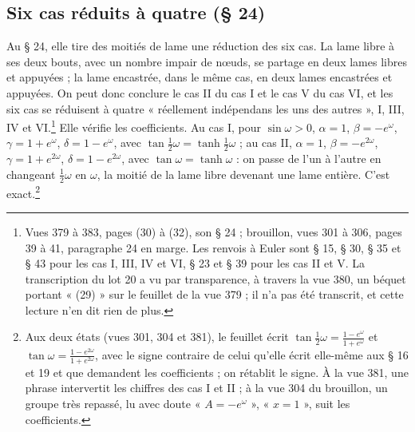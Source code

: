 \documentclass[11pt,a4paper]{article}
\begin{document}
\subsection*{Six cas réduits à quatre (§ 24)}

Au § 24, elle tire des moitiés de lame une réduction des six cas. La lame libre à ses deux bouts, avec un nombre impair de nœuds, se partage en deux lames libres et appuyées ; la lame encastrée, dans le même cas, en deux lames encastrées et appuyées. On peut donc conclure le cas II du cas I et le cas V du cas VI, et les six cas se réduisent à quatre « réellement indépendans les uns des autres », I, III, IV et VI.\footnote{Vues 379 à 383, pages (30) à (32), son § 24 ; brouillon, vues 301 à 306, pages 39 à 41, paragraphe 24 en marge. Les renvois à Euler sont § 15, § 30, § 35 et § 43 pour les cas I, III, IV et VI, § 23 et § 39 pour les cas II et V. La transcription du lot 20 a vu par transparence, à travers la vue 380, un béquet portant « (29) » sur le feuillet de la vue 379 ; il n'a pas été transcrit, et cette lecture n'en dit rien de plus.} Elle vérifie les coefficients. Au cas I, pour $\sin\omega>0$, $\alpha=1$, $\beta=-e^{\omega}$, $\gamma=1+e^{\omega}$, $\delta=1-e^{\omega}$, avec $\tan\frac12\omega=\tanh\frac12\omega$ ; au cas II, $\alpha=1$, $\beta=-e^{2\omega}$, $\gamma=1+e^{2\omega}$, $\delta=1-e^{2\omega}$, avec $\tan\omega=\tanh\omega$ : on passe de l'un à l'autre en changeant $\frac12\omega$ en $\omega$, la moitié de la lame libre devenant une lame entière. C'est exact.\footnote{Aux deux états (vues 301, 304 et 381), le feuillet écrit $\tan\frac12\omega=\frac{1-e^{\omega}}{1+e^{\omega}}$ et $\tan\omega=\frac{1-e^{2\omega}}{1+e^{2\omega}}$, avec le signe contraire de celui qu'elle écrit elle-même aux § 16 et 19 et que demandent les coefficients ; on rétablit le signe. À la vue 381, une phrase intervertit les chiffres des cas I et II ; à la vue 304 du brouillon, un groupe très repassé, lu avec doute « $A=-e^{\omega}$ », « $x=1$ », suit les coefficients.}
\end{document}
